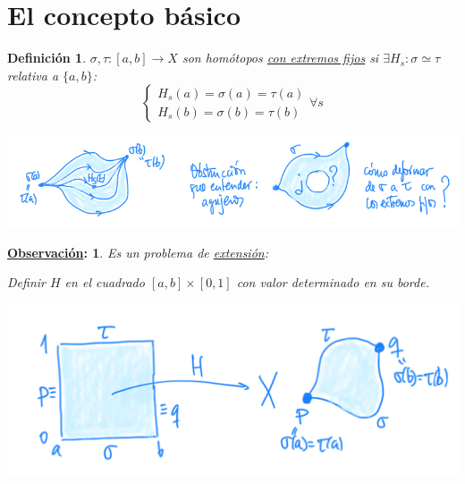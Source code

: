 \documentclass[10pt,a4paper,openright]{book}
\theoremstyle{break}
\newtheorem*{defi}{Definición}
\newtheorem*{obs}{\underline{Observación}:}
\begin{document}
\section{El concepto básico}%
\label{sec:el_concepto_basico}
\begin{defi}
$\sigma, \tau: \left[ a, b \right] \rightarrow X$ son homótopos \underline{con extremos fijos} si $\exists H_s: \sigma \simeq \tau$ relativa a $\{a, b\}$: 
\[
\begin{cases}
    H_s\left( a \right) = \sigma\left( a \right) = \tau\left( a \right)\\
    H_s\left( b \right) = \sigma\left( b \right) = \tau\left( b \right) 
\end{cases}\forall s
\]
\begin{center}
    \includegraphics[scale=0.3]{images/def_homp_ext_fijos} 
\end{center}
\end{defi}

\begin{obs}
Es un problema de \underline{extensión}: 

Definir $H$ en el cuadrado $\left[ a, b \right] \times \left[ 0, 1 \right]$ con valor determinado en su borde.
\begin{center}
    \includegraphics[scale=0.3]{images/obs_problema_ext} 
\end{center}
\end{obs}
\end{document}
